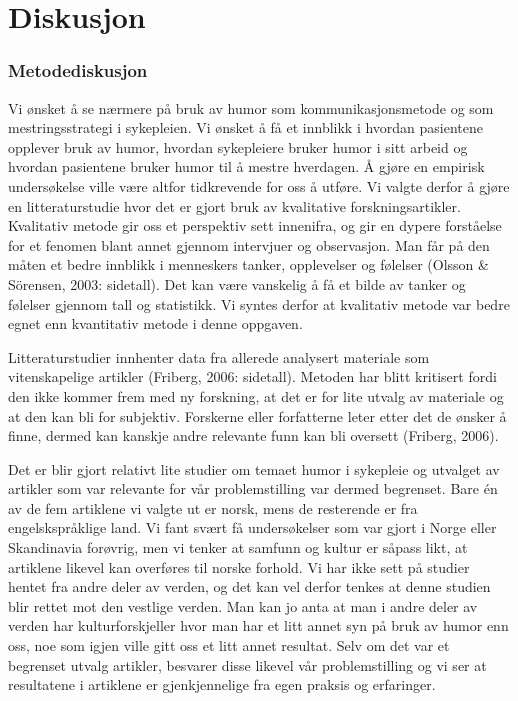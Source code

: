 \chapter{Diskusjon}

\subsection{Metodediskusjon}

Vi ønsket å se nærmere på bruk av humor som kommunikasjonsmetode og som
mestringsstrategi i sykepleien. Vi ønsket å få et innblikk i hvordan pasientene
opplever bruk av humor, hvordan sykepleiere bruker humor i sitt arbeid og
hvordan pasientene bruker humor til å mestre hverdagen. Å gjøre en empirisk
undersøkelse ville være altfor tidkrevende for oss å utføre. Vi valgte derfor å
gjøre en litteraturstudie hvor det er gjort bruk av kvalitative
forskningsartikler. Kvalitativ metode gir oss et perspektiv sett innenifra, og
gir en dypere forståelse for et fenomen blant annet gjennom intervjuer og
observasjon. Man får på den måten et bedre innblikk i menneskers tanker,
opplevelser og følelser (Olsson \&{} Sörensen, 2003: sidetall). Det kan være
vanskelig å få et bilde av tanker og følelser gjennom tall og statistikk. Vi
syntes derfor at kvalitativ metode var bedre egnet enn kvantitativ metode i
denne oppgaven.

Litteraturstudier innhenter data fra allerede analysert materiale som
vitenskapelige artikler (Friberg, 2006: sidetall). Metoden har blitt kritisert
fordi den ikke kommer frem med ny forskning, at det er for lite utvalg av
materiale og at den kan bli for subjektiv. Forskerne eller forfatterne leter
etter det de ønsker å finne, dermed kan kanskje andre relevante funn kan bli
oversett (Friberg, 2006).

Det er blir gjort relativt lite studier om temaet humor i sykepleie og utvalget
av artikler som var relevante for vår problemstilling var dermed begrenset.
Bare én av de fem artiklene vi valgte ut er norsk, mens de resterende er fra
engelskspråklige land. Vi fant svært få undersøkelser som var gjort i Norge
eller Skandinavia forøvrig, men vi tenker at samfunn og kultur er såpass likt,
at artiklene likevel kan overføres til norske forhold. Vi har ikke sett på
studier hentet fra andre deler av verden, og det kan vel derfor tenkes at denne
studien blir rettet mot den vestlige verden. Man kan jo anta at man i andre
deler av verden har kulturforskjeller hvor man har et litt annet syn på bruk av
humor enn oss, noe som igjen ville gitt oss et litt annet resultat. Selv om det
var et begrenset utvalg artikler, besvarer disse likevel vår problemstilling og
vi ser at resultatene i artiklene er gjenkjennelige fra egen praksis og
erfaringer.

